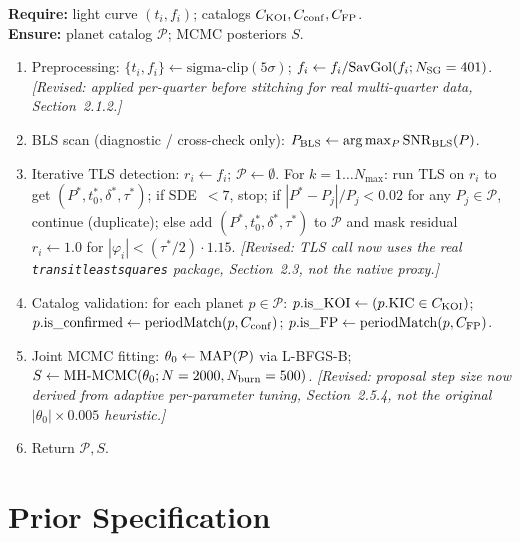 \documentclass[11pt]{article}
\begin{document}
\noindent\textbf{Require:} light curve $(t_i,f_i)$; catalogs $C_{\rm KOI}, C_{\rm conf}, C_{\rm FP}$.\\
\textbf{Ensure:} planet catalog $\mathcal P$; MCMC posteriors $S$.
\begin{enumerate}[leftmargin=*]
\item Preprocessing: $\{t_i,f_i\} \leftarrow \text{sigma-clip}(5\sigma)$; $f_i \leftarrow f_i / \text{SavGol}(f_i; N_{\rm SG}=401)$. \emph{[Revised: applied per-quarter before stitching for real multi-quarter data, Section~2.1.2.]}
\item BLS scan (diagnostic / cross-check only): $P_{\rm BLS} \leftarrow \arg\max_P {\rm SNR}_{\rm BLS}(P)$.
\item Iterative TLS detection: $r_i \leftarrow f_i$; $\mathcal P \leftarrow \emptyset$. For $k=1\ldots N_{\max}$: run TLS on $r_i$ to get $(P^*,t_0^*,\delta^*,\tau^*)$; if SDE~$<7$, stop; if $|P^*-P_j|/P_j<0.02$ for any $P_j\in\mathcal P$, continue (duplicate); else add $(P^*,t_0^*,\delta^*,\tau^*)$ to $\mathcal P$ and mask residual $r_i \leftarrow 1.0$ for $|\varphi_i|<(\tau^*/2)\cdot1.15$. \emph{[Revised: TLS call now uses the real \texttt{transitleastsquares} package, Section~2.3, not the native proxy.]}
\item Catalog validation: for each planet $p\in\mathcal P$: $p.{\rm is\_KOI} \leftarrow (p.{\rm KIC}\in C_{\rm KOI})$; $p.{\rm is\_confirmed} \leftarrow {\rm periodMatch}(p,C_{\rm conf})$; $p.{\rm is\_FP} \leftarrow {\rm periodMatch}(p,C_{\rm FP})$.
\item Joint MCMC fitting: $\theta_0 \leftarrow {\rm MAP}(\mathcal P)$ via L-BFGS-B; $S \leftarrow \text{MH-MCMC}(\theta_0; N=2000, N_{\rm burn}=500)$. \emph{[Revised: proposal step size now derived from adaptive per-parameter tuning, Section~2.5.4, not the original $|\theta_0|\times0.005$ heuristic.]}
\item Return $\mathcal P, S$.
\end{enumerate}

\section{Prior Specification}
\end{document}
